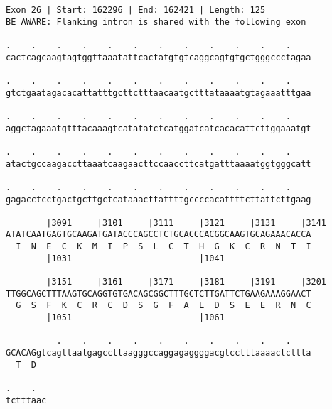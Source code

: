 \documentclass{article}
\begin{document}
\newpage
\begin{Verbatim}[fontfamily=courier]
Exon 26 | Start: 162296 | End: 162421 | Length: 125
BE AWARE: Flanking intron is shared with the following exon

.    .    .    .    .    .    .    .    .    .    .    .    
cactcagcaagtagtggttaaatattcactatgtgtcaggcagtgtgctgggccctagaa

.    .    .    .    .    .    .    .    .    .    .    .    
gtctgaatagacacattatttgcttctttaacaatgctttataaaatgtagaaatttgaa

.    .    .    .    .    .    .    .    .    .    .    .    
aggctagaaatgtttacaaagtcatatatctcatggatcatcacacattcttggaaatgt

.    .    .    .    .    .    .    .    .    .    .    .    
atactgccaagaccttaaatcaagaacttccaaccttcatgatttaaaatggtgggcatt

.    .    .    .    .    .    .    .    .    .    .    .    
gagacctcctgactgcttgctcataaacttattttgccccacattttcttattcttgaag

        |3091     |3101     |3111     |3121     |3131     |3141
ATATCAATGAGTGCAAGATGATACCCAGCCTCTGCACCCACGGCAAGTGCAGAAACACCA
  I  N  E  C  K  M  I  P  S  L  C  T  H  G  K  C  R  N  T  I
        |1031                         |1041                 

        |3151     |3161     |3171     |3181     |3191     |3201
TTGGCAGCTTTAAGTGCAGGTGTGACAGCGGCTTTGCTCTTGATTCTGAAGAAAGGAACT
  G  S  F  K  C  R  C  D  S  G  F  A  L  D  S  E  E  R  N  C
        |1051                         |1061                 

          .    .    .    .    .    .    .    .    .    .    
GCACAGgtcagttaatgagccttaagggccaggagaggggacgtcctttaaaactcttta
  T  D                                                      

.    .  
tctttaac
\end{Verbatim}
\newpage
\end{document}

